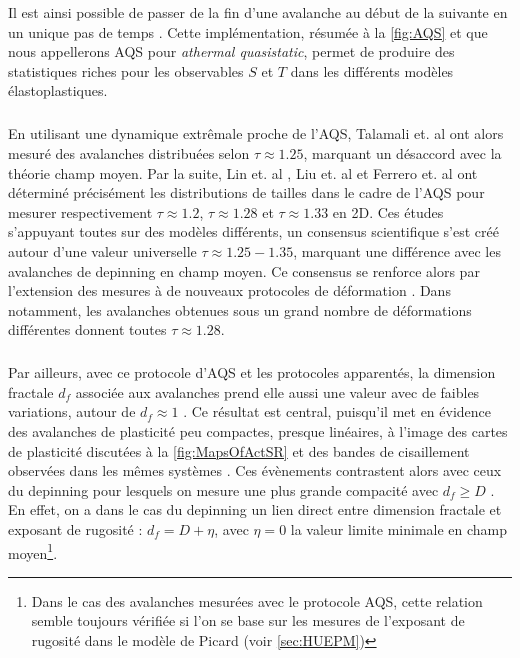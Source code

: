 \noindent Il est ainsi possible de passer de la fin d'une avalanche au début de la suivante en un unique pas de temps \cite{lin_scaling_2014}. Cette implémentation, résumée à la \autoref{fig:AQS} et que nous appellerons AQS pour \textit{athermal quasistatic}, permet de produire des statistiques riches pour les observables $S$ et $T$ dans les différents modèles élastoplastiques.

\subparagraph{}En utilisant une dynamique extrêmale proche de l'AQS, Talamali et. al \cite{talamali_avalanches_2011} ont alors mesuré des avalanches distribuées selon $\tau \approx 1.25$, marquant un désaccord avec la théorie champ moyen. Par la suite, Lin et. al \cite{lin_scaling_2014}, Liu et. al \cite{liu_driving_2016} et Ferrero et. al \cite{ferrero_criticality_2019} ont déterminé précisément les distributions de tailles dans le cadre de l'AQS pour mesurer respectivement $\tau \approx 1.2$, $\tau \approx 1.28$ et $\tau\approx 1.33$ en 2D. Ces études s'appuyant toutes sur des modèles différents, un consensus scientifique s'est créé autour d'une valeur universelle $\tau \approx 1.25-1.35$, marquant une différence avec les avalanches de depinning en champ moyen. Ce consensus se renforce alors par l'extension des mesures à de nouveaux protocoles de déformation \cite{lin_scaling_2014, budrikis_universal_2017}. Dans \cite{budrikis_universal_2017} notamment, les avalanches obtenues sous un grand nombre de déformations différentes donnent toutes $\tau\approx1.28$. 

\subparagraph{}Par ailleurs, avec ce protocole d'AQS et les protocoles apparentés, la dimension fractale $d_f$ associée aux avalanches prend elle aussi une valeur avec de faibles variations, autour de $d_f \approx 1$ \cite{liu_driving_2016, lin_scaling_2014, ferrero_criticality_2019}. Ce résultat est central, puisqu'il met en évidence des avalanches de plasticité peu compactes, presque linéaires, à l'image des cartes de plasticité discutées à la \autoref{fig:MapsOfActSR} et des bandes de cisaillement observées dans les mêmes systèmes \cite{martens_spontaneous_2012}. Ces évènements contrastent alors avec ceux du depinning pour lesquels on mesure une plus grande compacité avec $d_f \geq D$ \cite{wiese_theory_2022, le_priol_spatial_2021}. En effet, on a dans le cas du depinning un lien direct entre dimension fractale et exposant de rugosité : $d_f = D + \eta$, avec $\eta = 0$ la valeur limite minimale en champ moyen\footnote{Dans le cas des avalanches mesurées avec le protocole AQS, cette relation semble toujours vérifiée si l'on se base sur les mesures de l'exposant de rugosité dans le modèle de Picard (voir \autoref{sec:HUEPM})}.

